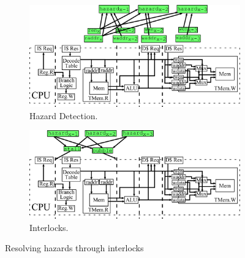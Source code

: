 \begin{figure}[htb]
\centering
  \begin{subfigure}[t]{0.8\textwidth}
  \centering
  \includegraphics[width=\textwidth]{figures/pipelinehazard.pdf}
  \caption{Hazard Detection.}
  \label{fig:haz}
  \end{subfigure}
  \begin{subfigure}[t]{0.8\textwidth}
  \vspace{20pt}
  \centering
  \includegraphics[width=\textwidth]{figures/pipelineinterlock.pdf}
  \caption{Interlocks.}
  \label{fig:int}
  \end{subfigure}
\caption{Resolving hazards through interlocks}
\label{fig:hazint}
\end{figure}

